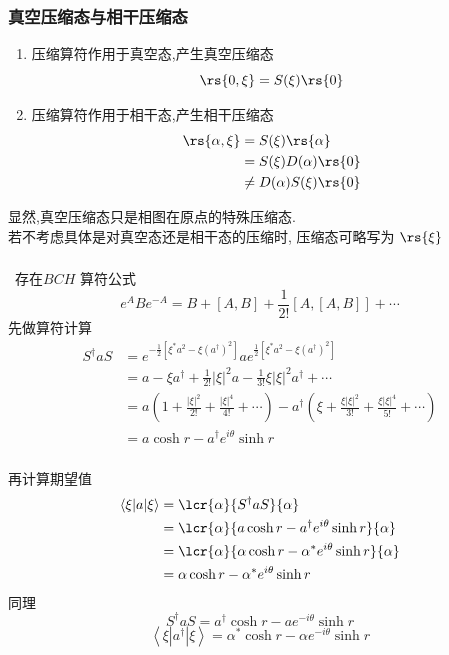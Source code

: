\begin{frame}
 \frametitle{真空压缩态与相干压缩态}
  \begin{enumerate}
      \item 压缩算符作用于真空态,产生真空压缩态
     \[ \rs{0,\xi }= S(\xi) \rs{0 }  \]
      \item 压缩算符作用于相干态,产生相干压缩态
    \[\begin{aligned}
          \rs{\alpha,\xi } &= S(\xi) \rs{\alpha } \\ 
          &=  S(\xi) D(\alpha) \rs{0} \\
          & \not = D(\alpha)S(\xi) \rs{0} 
    \end{aligned} \]  
  \end{enumerate}
  显然,真空压缩态只是相图在原点的特殊压缩态. \\ 
  若不考虑具体是对真空态还是相干态的压缩时, 压缩态可略写为 $\rs{\xi }$
\end{frame}

\begin{frame}
    \frametitle{}
    \例 [2. 试证明产生湮灭算符对压缩态的期望值为]{
    \[ \langle\xi|a| \xi\rangle=\alpha \cosh r- \alpha^{*}  e^{i\theta}\sinh r , \quad \left\langle\xi\left|a^{\dagger}\right| \xi\right\rangle=\alpha^{*} \cosh r -\alpha  e^{-i\theta}\sinh r \]
    } 
    \证 ~存在$BCH$ 算符公式
    \[ e^A B e^{-A} = B+ [A,B] + \frac{1}{2!}[A,[A,B]] + \cdots \]
    先做算符计算
    \[\begin{aligned}
        S^\dagger a S &= e^{-\frac{1}{2}[\xi^* a^2 - \xi (a^{\dagger}) ^2]} a  e^{\frac{1}{2}[\xi^* a^2 - \xi (a^{\dagger}) ^2]} \\ 
        &=  a -\xi a^\dagger + \frac{1}{2!} \left|\xi\right|^2 a - \frac{1}{3!} \xi \left|\xi\right|^2 a^\dagger + \cdots \\  
        &=  a \left( 1 + \frac{\left|\xi\right|^2 }{2!} + \frac{\left|\xi\right|^4}{4!} + \cdots\right) - a^\dagger \left(  \xi  + \frac{\xi \left|\xi\right|^2}{3!} +   \frac{\xi \left|\xi\right|^4}{5!} + \cdots \right)\\ 
        &= a \cosh r- a^{\dagger}  e^{i\theta}\sinh r 
  \end{aligned} \]      
   \end{frame}

   \begin{frame}
    \frametitle{}
    再计算期望值
    \[\begin{aligned}
        \langle\xi |a| \xi\rangle &= \lcr {\alpha} {S^\dagger a S}{\alpha}  \\ 
        &= \lcr {\alpha} { a \cosh r- a^{\dagger}  e^{i\theta}\sinh r}{\alpha}  \\ 
        &= \lcr {\alpha} {\alpha \cosh r- \alpha^{*}  e^{i\theta}\sinh r }{\alpha}  \\ 
        &= \alpha \cosh r- \alpha^{*}  e^{i\theta}\sinh r 
  \end{aligned} \] 
  同理 
  \[  S^\dagger a S = a^{\dagger} \cosh r -a  e^{-i\theta}\sinh r \]
  \[ \left\langle\xi\left|a^{\dagger}\right| \xi\right\rangle=\alpha^{*} \cosh r -\alpha  e^{-i\theta}\sinh r\]
   \end{frame}


